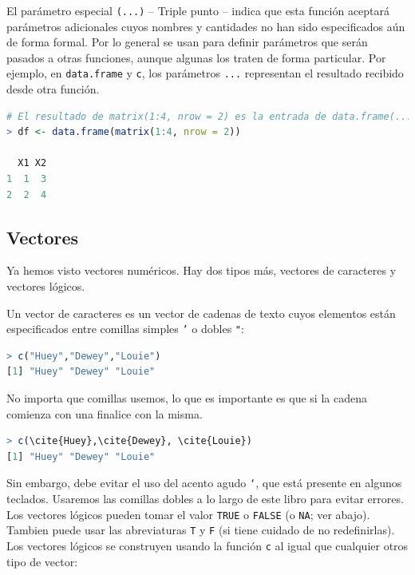 \documentclass[spanish]{extbook}
\numberwithin{equation}{section}
\numberwithin{figure}{section}
\begin{document}
El parámetro especial \texttt{(...)} -- Triple punto -- indica que esta función
aceptará parámetros adicionales cuyos nombres y cantidades no han sido
especificados aún de forma formal. Por lo general se usan para definir
parámetros que serán pasados a otras funciones, aunque algunas los traten de
forma particular.  Por ejemplo, en \texttt{data.frame} y \texttt{c}, los
parámetros \texttt{...} representan el resultado recibido desde otra función.

\begin{lstlisting}[language=R]
# El resultado de matrix(1:4, nrow = 2) es la entrada de data.frame(...)
> df <- data.frame(matrix(1:4, nrow = 2)) 

  X1 X2
1  1  3
2  2  4
\end{lstlisting}

\subsection{Vectores} \label{vectores}

Ya hemos visto vectores numéricos. Hay dos tipos más, vectores de caracteres y
vectores lógicos.

Un vector de caracteres es un vector de cadenas de texto cuyos elementos están
especificados entre comillas simples \texttt{'} o dobles \texttt{"}:

\begin{lstlisting}[language=R]
> c("Huey","Dewey","Louie")
[1] "Huey" "Dewey" "Louie"
\end{lstlisting}

No importa que comillas usemos, lo que es importante es que si la cadena
comienza con una finalice con la misma.

\begin{lstlisting}[language=R]
> c(\cite{Huey},\cite{Dewey}, \cite{Louie})
[1] "Huey" "Dewey" "Louie"
\end{lstlisting}

Sin embargo, debe evitar el uso del acento agudo \texttt{`}, que está presente
en algunos teclados. Usaremos las comillas dobles a lo largo de este libro para
evitar errores. Los vectores lógicos pueden tomar el valor \texttt{TRUE} o
\texttt{FALSE} (o \texttt{NA}; ver abajo). Tambien puede usar las abreviaturas
\texttt{T} y \texttt{F} (si tiene cuidado de no redefinirlas). Los vectores
lógicos se construyen usando la función \texttt{c} al igual que cualquier otros
tipo de vector:
\newpage
\end{document}
